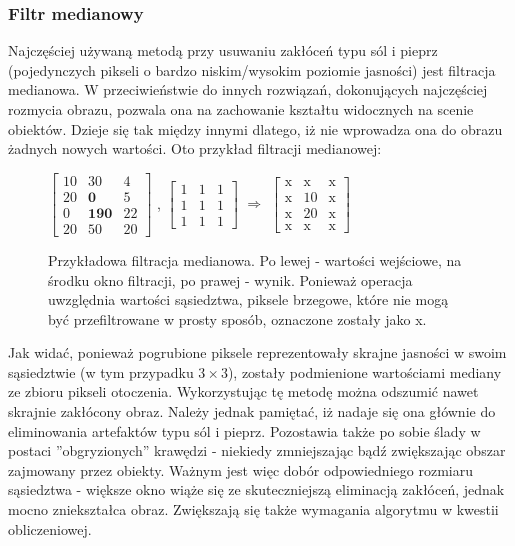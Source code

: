 \subsubsection{Filtr medianowy}
Najczęściej używaną metodą przy usuwaniu zakłóceń typu sól i pieprz (pojedynczych pikseli o bardzo niskim/wysokim poziomie jasności) jest filtracja medianowa. W przeciwieństwie do innych rozwiązań, dokonujących najczęściej rozmycia obrazu, pozwala ona na zachowanie kształtu widocznych na scenie obiektów. Dzieje się tak między innymi dlatego, iż nie wprowadza ona do obrazu żadnych nowych wartości. Oto przykład filtracji medianowej:
\begin{figure}[!htb]
\centering
$\begin{bmatrix}
    10 & 30  & 4 \\
    20 & \textbf{0}   & 5 \\
    0  & \textbf{190} & 22 \\
    20 & 50  & 20
\end{bmatrix}$ ,
$\begin{bmatrix}
    1 & 1 & 1 \\
    1 & 1 & 1 \\
    1 & 1 & 1
\end{bmatrix}$
$\Rightarrow$
$\begin{bmatrix}
    \mathrm{x} &  \mathrm{x}  & \mathrm{x} \\
    \mathrm{x} & 10 & \mathrm{x} \\
    \mathrm{x} & 20 & \mathrm{x} \\
    \mathrm{x} &  \mathrm{x}  & \mathrm{x} 
\end{bmatrix}$
\caption{Przykładowa filtracja medianowa. Po lewej - wartości wejściowe, na środku okno filtracji, po prawej - wynik. Ponieważ operacja uwzględnia wartości sąsiedztwa, piksele brzegowe, które nie mogą być przefiltrowane w prosty sposób, oznaczone zostały jako x.}
\end{figure}
Jak widać, ponieważ pogrubione piksele reprezentowały skrajne jasności w swoim sąsiedztwie (w tym przypadku $3\times 3$), zostały podmienione wartościami mediany ze zbioru pikseli otoczenia. Wykorzystując tę metodę można odszumić nawet skrajnie zakłócony obraz. Należy jednak pamiętać, iż nadaje się ona głównie do eliminowania artefaktów typu sól i pieprz. Pozostawia także po sobie ślady w postaci ''obgryzionych'' krawędzi - niekiedy zmniejszając bądź zwiększając obszar zajmowany przez obiekty. Ważnym jest więc dobór odpowiedniego rozmiaru sąsiedztwa - większe okno wiąże się ze skuteczniejszą eliminacją zakłóceń, jednak mocno zniekształca obraz. Zwiększają się także wymagania algorytmu w kwestii obliczeniowej.
